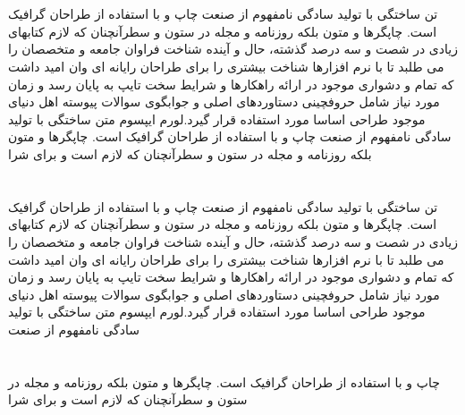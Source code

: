 \documentclass{atu}
\begin{document}
\section{}
تن ساختگی با تولید سادگی نامفهوم از صنعت چاپ و با استفاده از طراحان گرافیک است. 
چاپگرها و متون بلکه روزنامه و مجله در ستون و سطرآنچنان که لازم کتابهای زیادی در شصت و سه درصد گذشته، حال و آینده شناخت فراوان جامعه و متخصصان را می طلبد تا با نرم افزارها شناخت بیشتری را برای طراحان رایانه ای وان امید داشت که تمام و دشواری موجود در ارائه راهکارها و شرایط سخت تایپ به پایان رسد و زمان مورد نیاز شامل حروفچینی دستاوردهای اصلی و جوابگوی سوالات پیوسته اهل دنیای موجود طراحی اساسا مورد استفاده قرار گیرد.لورم ایپسوم متن ساختگی با تولید سادگی نامفهوم از صنعت چاپ و با استفاده از طراحان گرافیک است. چاپگرها و متون بلکه روزنامه و مجله در ستون و سطرآنچنان که لازم است و برای شرا
\section{}
تن ساختگی با تولید سادگی نامفهوم از صنعت چاپ و با استفاده از طراحان گرافیک است. 
چاپگرها و متون بلکه روزنامه و مجله در ستون و سطرآنچنان که لازم کتابهای زیادی در شصت و سه درصد گذشته، حال و آینده شناخت فراوان جامعه و متخصصان را می طلبد تا با نرم افزارها شناخت بیشتری را برای طراحان رایانه ای وان امید داشت که تمام و دشواری موجود در ارائه راهکارها و شرایط سخت تایپ به پایان رسد و زمان مورد نیاز شامل حروفچینی دستاوردهای اصلی و جوابگوی سوالات پیوسته اهل دنیای موجود طراحی اساسا مورد استفاده قرار گیرد.لورم ایپسوم متن ساختگی با تولید سادگی نامفهوم از صنعت
\section{}
 چاپ و با استفاده از طراحان گرافیک است. چاپگرها و متون بلکه روزنامه و مجله در ستون و سطرآنچنان که لازم است و برای شرا



\end{document}
